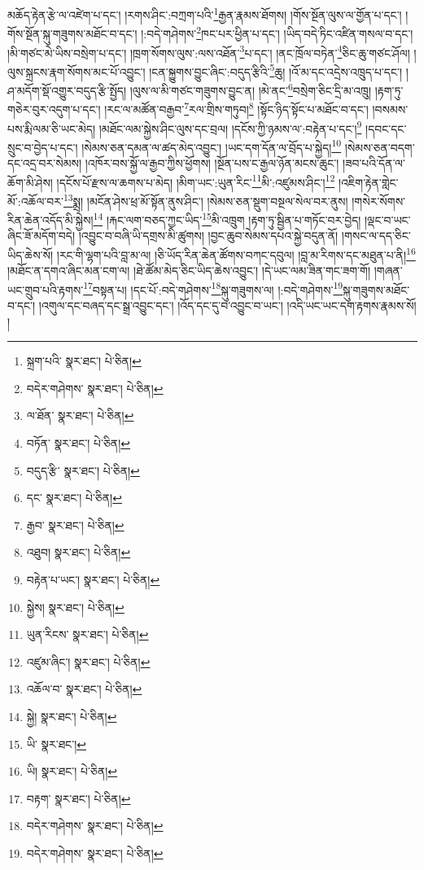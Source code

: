 མཆོད་རྟེན་རྩེ་ལ་འཛེག་པ་དང་། །རགས་ཤིང་:བཀྲག་པའི་\footnote{སྐྲག་པའི་  སྣར་ཐང་།  པེ་ཅིན། }རྒྱན་རྣམས་ཐོགས། །གོས་སྔོན་ལུས་ལ་གྱོན་པ་དང་། །གོས་སྔོན་སྐུ་གཟུགས་མཐོང་བ་དང་། །:བདེ་གཤེགས་\footnote{བདེར་གཤེགས་  སྣར་ཐང་།  པེ་ཅིན། }ཁང་པར་ཕྱིན་པ་དང་། །ཡིད་བདེ་ཏིང་འཛིན་གསལ་བ་དང་། །མི་གཙང་མེ་ཡིས་བསྲེག་པ་དང་། །ཁྲག་སོགས་ལུས་:ལས་འཐོན་\footnote{ལ་ཐོན་  སྣར་ཐང་།  པེ་ཅིན། }པ་དང་། །ནང་ཁྲོལ་བཏེན་\footnote{བཏོན་  སྣར་ཐང་།  པེ་ཅིན། }ཅིང་ཆུ་གཙང་ཤོལ། །ལུས་སྐྲངས་རྣག་སོགས་མང་པོ་འབྱུང་། །ངན་སྐྱུགས་བྱུང་ཞིང་:བདུད་རྩིའི་\footnote{བདུད་རྩི་  སྣར་ཐང་།  པེ་ཅིན། }ཆུ། །འོ་མ་དང་འདྲེས་འཁྲུད་པ་དང་། །ཤ་མདོག་སྡོ་འགྱུར་བདུད་རྩི་སྤྱོད། །ལུས་ལ་མི་གཙང་གཟུགས་བྱུང་ན། །མེ་ནང་\footnote{དང་  སྣར་ཐང་།  པེ་ཅིན། }བསྲེག་ཅིང་དྲི་མ་འཁྲུ། །རྟག་ཏུ་གཅེར་བུར་འདུག་པ་དང་། །རང་ལ་མཚོན་བརྒྱབ་\footnote{རྒྱབ་  སྣར་ཐང་།  པེ་ཅིན། }རལ་གྲིས་གཏུབ།\footnote{འཐུབ།  སྣར་ཐང་།  པེ་ཅིན། } །སྟོང་ཉིད་སྟོང་པ་མཐོང་བ་དང་། །བསམས་པས་རྨི་ལམ་ཅི་ཡང་མེད། །མཐོང་ལམ་སྐྱེས་ཤིང་ལུས་དང་བྲལ། །དངོས་ཀྱི་ཉམས་ལ་:བརྟེན་པ་དང་།\footnote{བརྟེན་པ་ཡང་།  སྣར་ཐང་།  པེ་ཅིན། } །དབང་དང་སྲུང་བ་བྱེད་པ་དང་། །སེམས་ཅན་དམན་ལ་ཚད་མེད་འབྱུང་། །ཡང་དག་དོན་ལ་བྲོད་པ་སྐྱེད།\footnote{སྐྱེས།  སྣར་ཐང་།  པེ་ཅིན། } །སེམས་ཅན་བདག་དང་འདྲ་བར་སེམས། །འཁོར་བས་སྐྱོ་ལ་རྒྱབ་ཀྱིས་ཕྱོགས། །སྔོན་པས་ང་རྒྱལ་ཉོན་མངས་ཆུང་། །ཟབ་པའི་དོན་ལ་ཆོག་མི་ཤེས། །དངོས་པོ་རྫས་ལ་ཆགས་པ་མེད། །མིག་ཡང་:ཡུན་རིང་\footnote{ཡུན་རིངས་  སྣར་ཐང་།  པེ་ཅིན། }མི་:འཛུམས་ཤིང་།\footnote{འཛུམ་ཞིང་།  སྣར་ཐང་།  པེ་ཅིན། } །འཇིག་རྟེན་གླེང་མོ་:འཆོལ་བར་\footnote{འཆོལ་བ་  སྣར་ཐང་།  པེ་ཅིན། }སྨྲ། །མངོན་ཤེས་ཕྲ་མོ་སྟོན་ནུས་ཤིང་། །སེམས་ཅན་སྡུག་བསྔལ་སེལ་བར་ནུས། །གསེར་སོགས་རིན་ཆེན་འདོད་མི་སྐྱེས།\footnote{སྐྱེ།  སྣར་ཐང་།  པེ་ཅིན། } །རྐང་ལག་བཅད་ཀྱང་ཡིད་\footnote{ཡི་  སྣར་ཐང་། }མི་འཁྲུག །རྟག་ཏུ་སྦྱིན་པ་གཏོང་བར་བྱེད། །ལྡང་བ་ཡང་ཞིང་ཟོ་མདོག་བདེ། །འབྱུང་བ་བཞི་ཡི་དགྲས་མི་ཚུགས། །བྱང་ཆུབ་སེམས་དཔའ་སྐྱེ་བདུན་ནོ། །གསང་ལ་དད་ཅིང་ཡིད་ཆེས་སོ། །རང་གི་ལྷག་པའི་བླ་མ་ལ། །ཅི་ཡོད་རིན་ཆེན་ཚོགས་བཀང་དབུལ། །བླ་མ་རིགས་དང་མཐུན་པ་ནི།\footnote{ཡི།  སྣར་ཐང་།  པེ་ཅིན། } །མཐོང་ན་དགའ་ཞིང་མན་ངག་ལ། །ཐེ་ཚོམ་མེད་ཅིང་ཡིད་ཆེས་འབྱུང་། །དེ་ཡང་ལམ་ཟིན་གང་ཟག་གོ། །གཞན་ཡང་གྲུབ་པའི་རྟགས་\footnote{བརྟག་  སྣར་ཐང་།  པེ་ཅིན། }བསྟན་པ། །དང་པོ་:བདེ་གཤེགས་\footnote{བདེར་གཤེགས་  སྣར་ཐང་།  པེ་ཅིན། }སྐུ་གཟུགས་ལ། །:བདེ་གཤེགས་\footnote{བདེར་གཤེགས་  སྣར་ཐང་།  པེ་ཅིན། }སྐུ་གཟུགས་མཐོང་བ་དང་། །འགུལ་དང་བཞད་དང་སྒྲ་འབྱུང་དང་། །འོད་དང་དུ་བ་འབྱུང་བ་ཡང་། །འདི་ཡང་ཡང་དག་རྟགས་རྣམས་སོ། །
